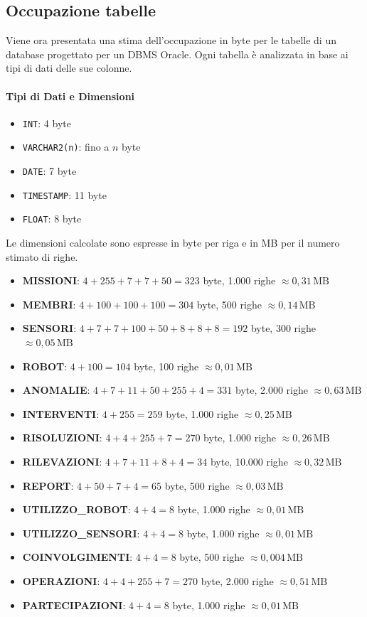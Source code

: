 \subsection{Occupazione tabelle}
Viene ora presentata una stima dell'occupazione in byte per le tabelle di un database progettato per un DBMS Oracle. Ogni tabella è analizzata in base ai tipi di dati delle sue colonne.

\paragraph{Tipi di Dati e Dimensioni}
\begin{itemize}
    \item \texttt{INT}: 4 byte
    \item \texttt{VARCHAR2(n)}: fino a $n$ byte
    \item \texttt{DATE}: 7 byte
    \item \texttt{TIMESTAMP}: 11 byte
    \item \texttt{FLOAT}: 8 byte
\end{itemize}

\noindent
Le dimensioni calcolate sono espresse in byte per riga e in MB per il numero stimato di righe.

\begin{itemize}
    \item \textbf{MISSIONI}: $4 + 255 + 7 + 7 + 50 = 323$ byte, 1.000 righe \(\approx 0,31\,\text{MB}\)
    \item \textbf{MEMBRI}: $4 + 100 + 100 + 100 = 304$ byte, 500 righe \(\approx 0,14\,\text{MB}\)
    \item \textbf{SENSORI}: $4 + 7 + 7 + 100 + 50 + 8 + 8 + 8 = 192$ byte, 300 righe \(\approx 0,05\,\text{MB}\)
    \item \textbf{ROBOT}: $4 + 100 = 104$ byte, 100 righe \(\approx 0,01\,\text{MB}\)
    \item \textbf{ANOMALIE}: $4 + 7 + 11 + 50 + 255 + 4 = 331$ byte, 2.000 righe \(\approx 0,63\,\text{MB}\)
    \item \textbf{INTERVENTI}: $4 + 255 = 259$ byte, 1.000 righe \(\approx 0,25\,\text{MB}\)
    \item \textbf{RISOLUZIONI}: $4 + 4 + 255 + 7 = 270$ byte, 1.000 righe \(\approx 0,26\,\text{MB}\)
    \item \textbf{RILEVAZIONI}: $4 + 7 + 11 + 8 + 4 = 34$ byte, 10.000 righe \(\approx 0,32\,\text{MB}\)
    \item \textbf{REPORT}: $4 + 50 + 7 + 4 = 65$ byte, 500 righe \(\approx 0,03\,\text{MB}\)
    \item \textbf{UTILIZZO\_ROBOT}: $4 + 4 = 8$ byte, 1.000 righe \(\approx 0,01\,\text{MB}\)
    \item \textbf{UTILIZZO\_SENSORI}: $4 + 4 = 8$ byte, 1.000 righe \(\approx 0,01\,\text{MB}\)
    \item \textbf{COINVOLGIMENTI}: $4 + 4 = 8$ byte, 500 righe \(\approx 0,004\,\text{MB}\)
    \item \textbf{OPERAZIONI}: $4 + 4 + 255 + 7 = 270$ byte, 2.000 righe \(\approx 0,51\,\text{MB}\)
    \item \textbf{PARTECIPAZIONI}: $4 + 4 = 8$ byte, 1.000 righe \(\approx 0,01\,\text{MB}\)
\end{itemize}

